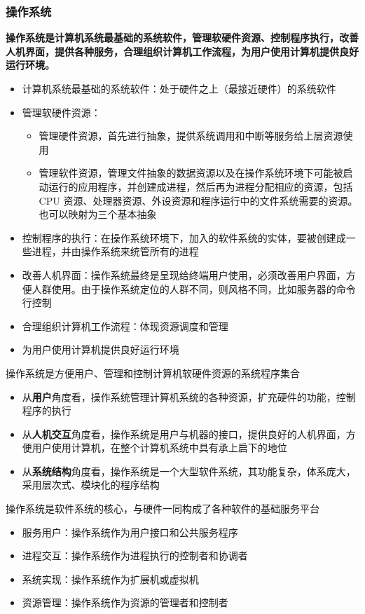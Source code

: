 \documentclass[cs4size,a4paper,10pt]{ctexart}
\begin{document}
	\subsubsection{操作系统}
	\textbf{操作系统是计算机系统最基础的系统软件，管理软硬件资源、控制程序执行，改善人机界面，提供各种服务，合理组织计算机工作流程，为用户使用计算机提供良好运行环境。}
	\begin{itemize}
		\item 计算机系统最基础的系统软件：处于硬件之上（最接近硬件）的系统软件
		\item 管理软硬件资源：
		\begin{itemize}
			\item 管理硬件资源，首先进行抽象，提供系统调用和中断等服务给上层资源使用
			\item 管理软件资源，管理文件抽象的数据资源以及在操作系统环境下可能被启动运行的应用程序，并创建成进程，然后再为进程分配相应的资源，包括 CPU 资源、处理器资源、外设资源和程序运行中的文件系统需要的资源。也可以映射为三个基本抽象
		\end{itemize}
		\item 控制程序的执行：在操作系统环境下，加入的软件系统的实体，要被创建成一些进程，并由操作系统来统管所有的进程
		\item 改善人机界面：操作系统最终是呈现给终端用户使用，必须改善用户界面，方便人群使用。由于操作系统定位的人群不同，则风格不同，比如服务器的命令行控制
		\item 合理组织计算机工作流程：体现资源调度和管理
		\item 为用户使用计算机提供良好运行环境
	\end{itemize}


	操作系统是方便用户、管理和控制计算机软硬件资源的系统程序集合
	\begin{itemize}
		\item 从\textbf{用户}角度看，操作系统管理计算机系统的各种资源，扩充硬件的功能，控制程序的执行
		\item 从\textbf{人机交互}角度看，操作系统是用户与机器的接口，提供良好的人机界面，方便用户使用计算机，在整个计算机系统中具有承上启下的地位
		\item 从\textbf{系统结构}角度看，操作系统是一个大型软件系统，其功能复杂，体系庞大，采用层次式、模块化的程序结构
	\end{itemize}

	操作系统是软件系统的核心，与硬件一同构成了各种软件的基础服务平台
	\begin{itemize}
		\item 服务用户：操作系统作为用户接口和公共服务程序
		\item 进程交互：操作系统作为进程执行的控制者和协调者
		\item 系统实现：操作系统作为扩展机或虚拟机
		\item 资源管理：操作系统作为资源的管理者和控制者
	\end{itemize}
\end{document}

